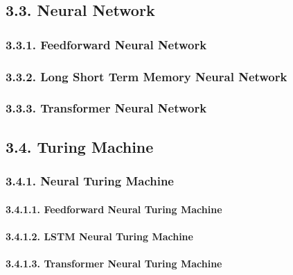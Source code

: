 \documentclass[
]{article}
\begin{document}
\hypertarget{neural-network}{%
\subsection{3.3. Neural Network}\label{neural-network}}

\hypertarget{feedforward-neural-network}{%
\subsubsection{3.3.1. Feedforward Neural
Network}\label{feedforward-neural-network}}

\hypertarget{long-short-term-memory-neural-network}{%
\subsubsection{3.3.2. Long Short Term Memory Neural
Network}\label{long-short-term-memory-neural-network}}

\hypertarget{transformer-neural-network}{%
\subsubsection{3.3.3. Transformer Neural
Network}\label{transformer-neural-network}}

\hypertarget{turing-machine}{%
\subsection{3.4. Turing Machine}\label{turing-machine}}

\hypertarget{neural-turing-machine}{%
\subsubsection{3.4.1. Neural Turing
Machine}\label{neural-turing-machine}}

\hypertarget{feedforward-neural-turing-machine}{%
\paragraph{3.4.1.1. Feedforward Neural Turing
Machine}\label{feedforward-neural-turing-machine}}

\hypertarget{lstm-neural-turing-machine}{%
\paragraph{3.4.1.2. LSTM Neural Turing
Machine}\label{lstm-neural-turing-machine}}

\hypertarget{transformer-neural-turing-machine}{%
\paragraph{3.4.1.3. Transformer Neural Turing
Machine}\label{transformer-neural-turing-machine}}
\end{document}
